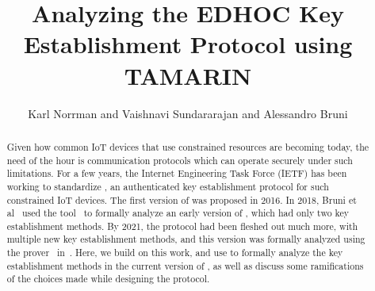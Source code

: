 \documentclass[runningheads]{llncs}
\title{Analyzing the EDHOC Key Establishment Protocol using TAMARIN}
\author{
        Karl Norrman and 
        Vaishnavi Sundararajan and
        Alessandro Bruni
}
\begin{document}
\maketitle
%
\begin{abstract}
Given how common IoT devices that use constrained resources are becoming today, the need of the hour is communication protocols which can operate securely under such limitations.
%
For a few years, the Internet Engineering Task Force (IETF) has been working to standardize \mEdhoc{}, an authenticated key establishment protocol for such constrained IoT devices.
%
The first version of \mEdhoc{} was proposed in 2016.
%
In 2018, Bruni et al~\cite{DBLP:conf/secsr/BruniJPS18} used the \mProverif{} tool~\cite{DBLP:conf/csfw/Blanchet01} to formally analyze an early version of \mEdhoc{}, which had only two key establishment methods.  
%
By 2021, the protocol had been fleshed out much more, with multiple new key establishment methods, and this version was formally analyzed using the \mTamarin{} prover~\cite{DBLP:conf/cav/MeierSCB13} in~\cite{Norr21}.
%
Here, we build on this work, and use \mTamarin{} to formally analyze the key establishment methods in the current version of \mEdhoc{}, as well as discuss some ramifications of the choices made while designing the protocol.
%

\end{abstract}
\end{document}
